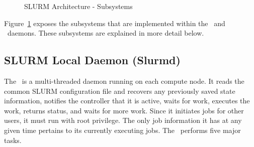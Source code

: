 %

\begin{figure}[tb]
\centerline{}
\caption{SLURM Architecture - Subsystems}
\label{archdetail}
\end{figure}

Figure~\ref{archdetail} exposes the subsystems that are implemented
within the \slurmd\ and \slurmctld\ daemons.  These subsystems
are explained in more detail below.

\subsection{SLURM Local Daemon (Slurmd)}

The \slurmd\ is a multi-threaded daemon running on each compute node.
It reads the common SLURM configuration file and recovers any
previously saved state information,
notifies the controller that it is active, waits for work,
executes the work, returns status, and waits for more work.
Since it initiates jobs for other users, it must run with root privilege.
The only job information it has at any given time pertains to its
currently executing jobs.
The \slurmd\ performs five major tasks.

